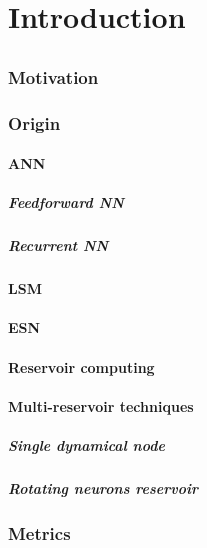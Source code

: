 \chapter{Introduction}\label{ch:Introduction}

\section{}\label{sec:RC}
\subsection{Motivation}
\subsection{Origin}
\subsubsection{ANN}
\paragraph{Feedforward NN}
\paragraph{Recurrent NN}
\subsubsection{LSM}
\subsubsection{ESN}
\subsubsection{Reservoir computing}
\subsubsection{Multi-reservoir techniques}
\paragraph{Single dynamical node}
\paragraph{Rotating neurons reservoir}
\subsection{Metrics}
